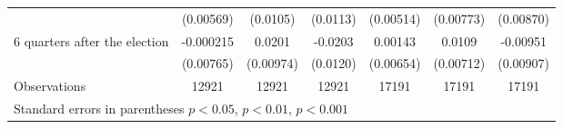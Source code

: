 \begin{table}[!ht]
\begin{tabular}{l*{6}{c}}
                    &   (0.00569)         &    (0.0105)         &    (0.0113)         &   (0.00514)         &   (0.00773)         &   (0.00870)         \\
[0,5em]
 6 quarters after the election&   -0.000215         &      0.0201\sym{*}  &     -0.0203         &     0.00143         &      0.0109         &    -0.00951         \\
                    &   (0.00765)         &   (0.00974)         &    (0.0120)         &   (0.00654)         &   (0.00712)         &   (0.00907)         \\
\hline
Observations        &       12921         &       12921         &       12921         &       17191         &       17191         &       17191         \\
\hline\hline
\multicolumn{7}{l}{\footnotesize Standard errors in parentheses \sym{*} \(p<0.05\), \sym{**} \(p<0.01\), \sym{***} \(p<0.001\)}\\
\end{tabular}
\end{table}
